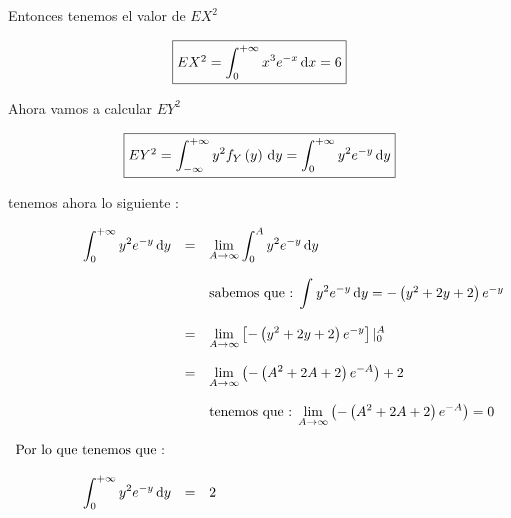 \documentclass[12pt]{article}
\begin{document}
    \begin{flushleft}
        Entonces tenemos el valor de $EX^2$
    \end{flushleft}

    \begin{equation*}
        \fbox{$
            EX^2 = \displaystyle \int_{0}^{+\infty}  x^3 e^{-x} \,\mathrm{d}x  =  6
        $}
    \end{equation*}

    \begin{flushleft}
        Ahora vamos a calcular $EY^2$
    \end{flushleft}

    \begin{equation*}
        \fbox{$
            EY^2 = \displaystyle \int_{-\infty}^{+\infty}  y^2 f_{Y}\left(y\right) \,\mathrm{d}y  = \displaystyle \int_{0}^{+\infty}  y^2 e^{-y} \,\mathrm{d}y
        $}
    \end{equation*}

    \begin{flushleft}
        tenemos ahora lo siguiente : 
    \end{flushleft}

    \begin{equation*}
        \begin{array}{rcl}
            \displaystyle \int_{0}^{+\infty}  y^2 e^{-y} \,\mathrm{d}y & = &\displaystyle \lim_{A \to \infty} \displaystyle \int_{0}^{A}  y^2 e^{-y} \,\mathrm{d}y
            \\
            \\
            && \mbox{sabemos que : $\displaystyle \int_{}^{}  y^2 e^{-y} \,\mathrm{d}y$}  =  - \left(y^2 + 2y + 2 \right) e^{-y}
            \\
            \\
            & = & \displaystyle \lim_{A \to \infty} \left[ - \left(y^2 + 2y + 2 \right) e^{-y}\right] \vert_{0}^{A}
            \\
            \\
            & = &  \displaystyle \lim_{A \to \infty} \left( - \left(A^2 + 2A + 2 \right) e^{-A}\right) + 2 
            \\
            \\
            && \mbox{tenemos que : $ \displaystyle \lim_{A \to \infty} \left( - \left(A^2 + 2A + 2 \right) e^{-A}\right) = 0 $} 
            \\
            \\
            \mbox{Por lo que tenemos que : }&&
            \\
            \\
            \displaystyle \int_{0}^{+\infty}  y^2 e^{-y} \,\mathrm{d}y & = & 2
        \end{array}
    \end{equation*}
\end{document}
